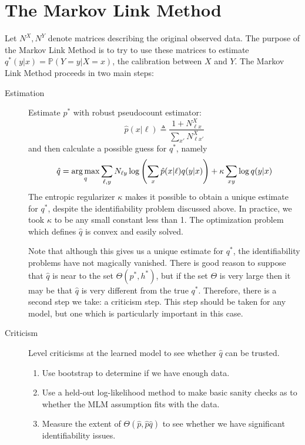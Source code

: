 \section{The Markov Link Method}

Let $N^X,N^Y$ denote matrices describing the original observed data. The purpose of the Markov Link Method is to try to use these matrices to estimate $q^*(y|x)=\mathbb{P}(Y=y|X=x)$, the calibration between $X$ and $Y$.  The Markov Link Method proceeds in two main steps:

\begin{description}
\item[Estimation]  Estimate $p^*$ with robust pseudocount estimator:
\[
\hat p(x|\ell) \triangleq \frac{1+N^X_{\ell x}}{\sum_{x'} N^X_{\ell x'}}
\]
and then calculate a possible guess for $q^*$, namely
\[
\hat q = \operatorname*{arg\,max}_q \sum_{\ell,y}N_{\ell y}\log\left(\sum_{x}\hat p(x|\ell)q(y|x)\right) + \kappa \sum_{xy} \log q(y|x)
\]
The entropic regularizer $\kappa$ makes it possible to obtain a unique estimate for $q^*$, despite the identifiability problem discussed above.   In practice, we took $\kappa$ to be any small constant less than 1.  The optimization problem which defines $\hat q$ is convex and easily solved.  

Note that although this gives us a unique estimate for $q^*$, the identifiability problems have not magically vanished.  There is good reason to suppose that $\hat q$ is near to the set $\Theta(p^*,h^*)$, but if the set $\Theta$ is very large then it may be that $\hat q$ is very different from the true $q^*$.   Therefore, there is a second step we take: a criticism step.  This step should be taken for any model, but one which is particularly important in this case.  
\item[Criticism]  Level criticisms at the learned model to see whether $\hat q$ can be trusted.  
\begin{enumerate}
\item Use bootstrap to determine if we have enough data.
\item Use a held-out log-likelihood method to make basic sanity checks as to whether the MLM assumption fits with the data.
\item Measure the extent of $\Theta(\hat p,\hat p \hat q)$ to see whether we have significant identifiability issues.
\end{enumerate}
\end{description}

